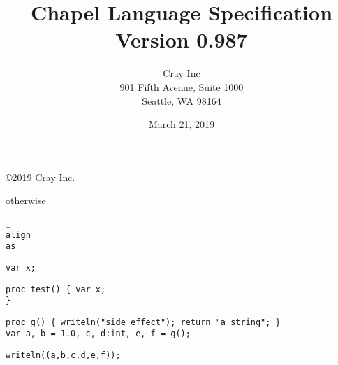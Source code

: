 \documentclass[10pt,oneside,titlepage]{spec}
\title{Chapel Language Specification\\Version 0.987}
\author{Cray Inc\\
901 Fifth Avenue, Suite 1000\\
Seattle, WA 98164}
\date{March 21, 2019}
\begin{document}
\pagestyle{empty}

\ifpdf
{}
\fi
\maketitle

\setcounter{page}{2}
\null\vfill
\noindent
\begin{center}
\copyright 2019 Cray Inc.
\end{center}

\pagestyle{myheadings}

\ifpdf
{}
\fi
\tableofcontents

\cleardoublepage

\pagestyle{myheadings}

\setlength{\parindent}{0in}
\setlength{\parskip}{4mm plus2mm minus1mm}


\begin{invisible}
otherwise
\end{invisible}

\begin{chapel}
\begin{verbatim}
_
align
as
\end{verbatim}
\end{chapel}


\begin{chapel}
\begin{verbatim}
var x;
\end{verbatim}
\end{chapel}

\begin{chapel}
\begin{verbatim}
proc test() { var x;
}
\end{verbatim}
\end{chapel}

\begin{chapel}
\begin{verbatim}
proc g() { writeln("side effect"); return "a string"; }
var a, b = 1.0, c, d:int, e, f = g();
\end{verbatim}
\end{chapel}
\begin{chapelpost}
\begin{verbatim}
writeln((a,b,c,d,e,f));
\end{verbatim}
\end{chapelpost}
\end{document}
